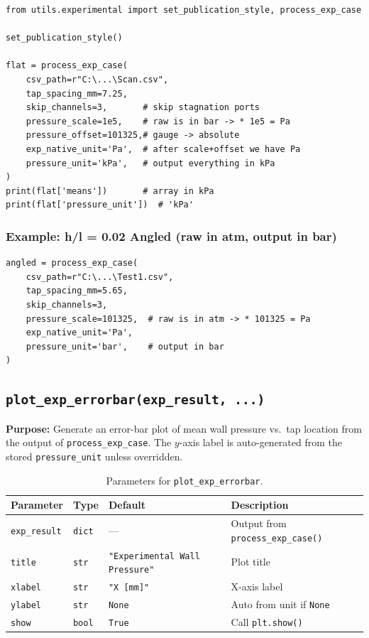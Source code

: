 \documentclass[11pt, letterpaper]{article}
\begin{document}
\begin{lstlisting}[caption={Processing a flat-plate experiment.}]
from utils.experimental import set_publication_style, process_exp_case

set_publication_style()

flat = process_exp_case(
    csv_path=r"C:\...\Scan.csv",
    tap_spacing_mm=7.25,
    skip_channels=3,       # skip stagnation ports
    pressure_scale=1e5,    # raw is in bar -> * 1e5 = Pa
    pressure_offset=101325,# gauge -> absolute
    exp_native_unit='Pa',  # after scale+offset we have Pa
    pressure_unit='kPa',   # output everything in kPa
)
print(flat['means'])       # array in kPa
print(flat['pressure_unit'])  # 'kPa'
\end{lstlisting}

\subsubsection*{Example: h/l = 0.02 Angled (raw in atm, output in bar)}

\begin{lstlisting}[caption={Processing an angled-geometry experiment.}]
angled = process_exp_case(
    csv_path=r"C:\...\Test1.csv",
    tap_spacing_mm=5.65,
    skip_channels=3,
    pressure_scale=101325,  # raw is in atm -> * 101325 = Pa
    exp_native_unit='Pa',
    pressure_unit='bar',    # output in bar
)
\end{lstlisting}

\subsection{\texttt{plot\_exp\_errorbar(exp\_result, ...)}}
\label{subsec:plot_exp_errorbar}

\textbf{Purpose:} Generate an error-bar plot of mean wall pressure vs.\
tap location from the output of \texttt{process\_exp\_case}. The
$y$-axis label is auto-generated from the stored
\texttt{pressure\_unit} unless overridden.

\begin{table}[h!]
\centering
\caption{Parameters for \texttt{plot\_exp\_errorbar}.}
\begin{tabular}{@{}llll@{}}
\toprule
\textbf{Parameter} & \textbf{Type} & \textbf{Default} & \textbf{Description} \\
\midrule
\texttt{exp\_result} & \texttt{dict}  & ---                              & Output from \texttt{process\_exp\_case()} \\
\texttt{title}       & \texttt{str}   & \texttt{"Experimental Wall Pressure"} & Plot title \\
\texttt{xlabel}      & \texttt{str}   & \texttt{"X [mm]"}                & X-axis label \\
\texttt{ylabel}      & \texttt{str}   & \texttt{None}                    & Auto from unit if \texttt{None} \\
\texttt{show}        & \texttt{bool}  & \texttt{True}                    & Call \texttt{plt.show()} \\
\bottomrule
\end{tabular}
\end{table}
\end{document}
